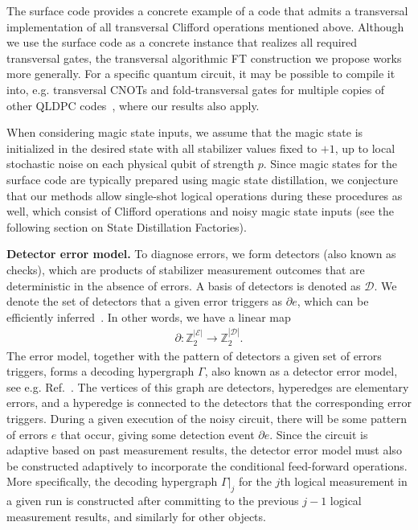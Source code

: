 The surface code provides a concrete example of a code that admits a transversal implementation of all transversal Clifford operations mentioned above.
%
Although we use the surface code as a concrete instance that realizes all required transversal gates, the transversal algorithmic FT construction we propose works more generally.
%
For a specific quantum circuit, it may be possible to compile it into, e.g. transversal CNOTs and fold-transversal gates for multiple copies of other QLDPC codes~\cite{breuckmann2024fold,quintavalle2023partitioning}, where our results also apply.

When considering magic state inputs, we assume that the magic state is initialized in the desired state with all stabilizer values fixed to $+1$, up to local stochastic noise on each physical qubit of strength $p$.
%
Since magic states for the surface code are typically prepared using magic state distillation, we conjecture that our methods allow single-shot logical operations during these procedures as well, which consist of Clifford operations and noisy magic state inputs (see the following section on State Distillation Factories).

\textbf{Detector error model.}
%
To diagnose errors, we form detectors (also known as checks), which are products of stabilizer measurement outcomes that are deterministic in the absence of errors.
%
A basis of detectors is denoted as $\mathcal{D}$.
%
We denote the set of detectors that a given error triggers as $\partial e$, which can be efficiently inferred~\cite{gidney2021stim}.
%
In other words, we have a linear map
\begin{align}
\partial:\mathbb{Z}_2^{|\mathcal{E}|}\rightarrow \mathbb{Z}_2^{|\mathcal{D}|}.
\end{align}
%
The error model, together with the pattern of detectors a given set of errors triggers, forms a decoding hypergraph $\Gamma$, also known as a detector error model, see e.g. Ref.~\cite{gidney2021stim,bombin2023modular,delfosse2023spacetime,higgott2023improved,cain2024correlated}.
%
The vertices of this graph are detectors, hyperedges are elementary errors, and a hyperedge is connected to the detectors that the corresponding error triggers.
%
During a given execution of the noisy circuit, there will be some pattern of errors $e$ that occur, giving some detection event $\partial e$.
%
Since the circuit is adaptive based on past measurement results, the detector error model must also be constructed adaptively to incorporate the conditional feed-forward operations.
%
More specifically, the decoding hypergraph $\Gamma|_j$ for the $j$th logical measurement in a given run is constructed after committing to the previous $j-1$ logical measurement results, and similarly for other objects.

